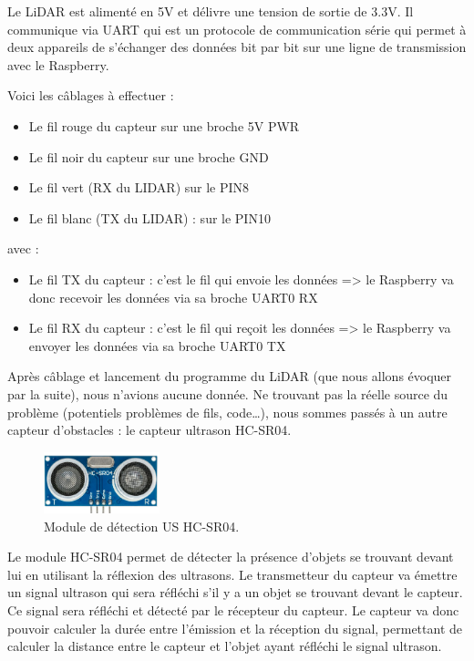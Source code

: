 \documentclass[a4paper,12pt]{report}  %
\begin{document}
Le LiDAR est alimenté en 5V et délivre une tension de sortie de 3.3V. 
Il communique via UART qui est un protocole de communication série qui permet à deux appareils de s’échanger des données bit par bit sur une ligne de transmission avec le Raspberry.

Voici les câblages à effectuer :

\begin{itemize}
	\item Le fil rouge du capteur sur une broche 5V PWR 
	\item Le fil noir du capteur sur une broche GND
	\item Le fil vert (RX du LIDAR) sur le PIN8
	\item Le fil blanc (TX du LIDAR) : sur le PIN10
\end{itemize}

avec : 

\begin{itemize}
	\item Le fil TX du capteur : c’est le fil qui envoie les données => le Raspberry va donc recevoir les données via sa broche UART0 RX
	\item Le fil RX du capteur : c’est le fil qui reçoit les données => le Raspberry va envoyer les données via sa broche UART0 TX
\end{itemize}

Après câblage et lancement du programme du LiDAR (que nous allons évoquer par la suite), nous n’avions aucune donnée. Ne trouvant pas la réelle source du problème (potentiels problèmes de fils, code…), nous sommes passés à un autre capteur d’obstacles : le capteur ultrason HC-SR04. 

\begin{figure}[H]
	\centering
	\includegraphics[width=0.3\textwidth]{./attachments/capteur_ultrason.jpg}
	\caption{Module de détection US HC-SR04.}
	\label{fig:capteur_us}
	
\end{figure}



Le module HC-SR04 permet de détecter la présence d’objets se trouvant devant lui en utilisant la réflexion des ultrasons. Le transmetteur du capteur va émettre un signal ultrason qui sera réfléchi s’il y a un objet se trouvant devant le capteur. Ce signal sera réfléchi et détecté par le récepteur du capteur. Le capteur va donc pouvoir calculer la durée entre l’émission et la réception du signal, permettant de calculer la distance entre le capteur et l’objet ayant réfléchi le signal ultrason. 
\end{document}
